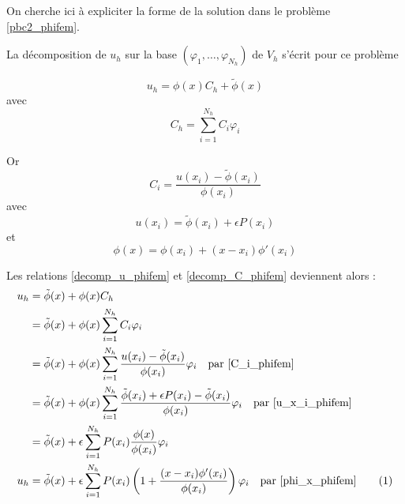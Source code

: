 \documentclass[french]{article}
\newcommand\numberthis{\addtocounter{equation}{1}\tag{\theequation}}
\begin{document}
	On cherche ici à expliciter la forme de la solution dans le problème \ref{pbc2_phifem}.

	La décomposition de $u_h$ sur la base $(\varphi_1,\dots,\varphi_{N_h})$ de $V_h$ s'écrit pour ce problème
	
	\begin{equation}
		u_h=\phi(x)C_h+\tilde{\phi}(x) \label{decomp_u_phifem}
	\end{equation}
	avec
	\begin{equation}
		C_h=\sum_{i=1}^{N_h}C_i\varphi_i \label{decomp_C_phifem}
	\end{equation}
	
	Or 
	\begin{equation}
		C_i=\frac{u(x_i)-\tilde{\phi}(x_i)}{\phi(x_i)} \label{C_i_phifem}
	\end{equation}
	avec
	\begin{equation}
		u(x_i)=\tilde{\phi}(x_i)+\epsilon P(x_i) \label{u_x_i_phifem}
	\end{equation}
	et
	\begin{equation}
		\phi(x)=\phi(x_i)+(x-x_i)\phi'(x_i) \label{phi_x_phifem}
	\end{equation}

	Les relations \ref{decomp_u_phifem} et \ref{decomp_C_phifem} deviennent alors :
	\begin{align*}
		u_h&=\tilde{\phi}(x)+\phi(x)C_h \\
		&=\tilde{\phi}(x)+\phi(x)\sum_{i=1}^{N_h}C_i\varphi_i \\
		&=\tilde{\phi}(x)+\phi(x)\sum_{i=1}^{N_h}\frac{u(x_i)-\tilde{\phi}(x_i)}{\phi(x_i)}\varphi_i \quad \text{par \ref{C_i_phifem}} \\
		&=\tilde{\phi}(x)+\phi(x)\sum_{i=1}^{N_h}\frac{\tilde{\phi}(x_i)+\epsilon P(x_i)-\tilde{\phi}(x_i)}{\phi(x_i)}\varphi_i \quad \text{par \ref{u_x_i_phifem}} \\
		&=\tilde{\phi}(x)+\epsilon\sum_{i=1}^{N_h}P(x_i)\frac{\phi(x)}{\phi(x_i)}\varphi_i \\
		u_h&=\tilde{\phi}(x)+\epsilon\sum_{i=1}^{N_h}P(x_i)\left(1+\frac{(x-x_i)\phi'(x_i)}{\phi(x_i)}\right)\varphi_i \quad \text{par \ref{phi_x_phifem}} \numberthis \label{result_phifem}
	\end{align*}
	
\end{document}
